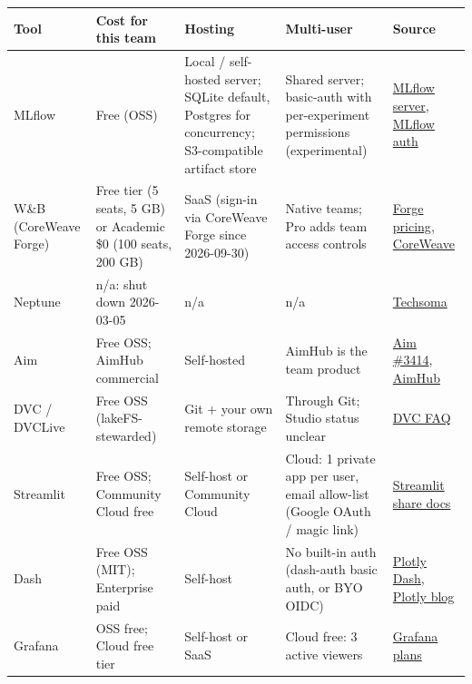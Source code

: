 \documentclass{article}
\begin{document}
\begin{center}\small
\begin{tabularx}{\linewidth}{>{\raggedright\arraybackslash}X >{\raggedright\arraybackslash}X >{\raggedright\arraybackslash}X >{\raggedright\arraybackslash}X >{\raggedright\arraybackslash}X}
\toprule
\textbf{Tool} & \textbf{Cost for this team} & \textbf{Hosting} & \textbf{Multi-user} & \textbf{Source} \\
\midrule
MLflow & Free (OSS) & Local /\allowbreak{} self-hosted server; SQLite default, Postgres for concurrency; S3-compatible artifact store & Shared server; basic-auth with per-experiment permissions (experimental) & \href{https://mlflow.org/docs/latest/self-hosting/architecture/tracking-server/}{MLflow server}, \href{https://mlflow.org/docs/latest/self-hosting/security/basic-http-auth/}{MLflow auth} \\
W\&B (CoreWeave Forge) & Free tier (5 seats, 5 GB) or Academic \$0 (100 seats, 200 GB) & SaaS (sign-in via CoreWeave Forge since 2026-09-30) & Native teams; Pro adds team access controls & \href{https://coreweave.com/forge-pricing}{Forge pricing}, \href{https://www.coreweave.com/companies/weights-and-biases}{CoreWeave} \\
Neptune & n/\allowbreak{}a: shut down 2026-03-05 & n/\allowbreak{}a & n/\allowbreak{}a & \href{https://techsoma.ca/openai-neptune-acquisition-shutdown/}{Techsoma} \\
Aim & Free OSS; AimHub commercial & Self-hosted & AimHub is the team product & \href{https://github.com/aimhubio/aim/issues/3414}{Aim \#3414}, \href{https://aimstack.io/blog/new-releases/introducing-aimhub-aim-now-available-for-teams}{AimHub} \\
DVC /\allowbreak{} DVCLive & Free OSS (lakeFS-stewarded) & Git + your own remote storage & Through Git; Studio status unclear & \href{https://dvc.org/blog/dvc-joins-lakefs-your-questions-answered/}{DVC FAQ} \\
Streamlit & Free OSS; Community Cloud free & Self-host or Community Cloud & Cloud: 1 private app per user, email allow-list (Google OAuth /\allowbreak{} magic link) & \href{https://docs.streamlit.io/deploy/streamlit-community-cloud/share-your-app}{Streamlit share docs} \\
Dash & Free OSS (MIT); Enterprise paid & Self-host & No built-in auth (dash-auth basic auth, or BYO OIDC) & \href{https://plotly.com/dash/}{Plotly Dash}, \href{https://plotly.com/blog/how-to-keep-your-data-safe-with-dash/}{Plotly blog} \\
Grafana & OSS free; Cloud free tier & Self-host or SaaS & Cloud free: 3 active viewers & \href{https://grafana.com/docs/grafana-cloud/platform/pricing-and-usage/stack-plans/}{Grafana plans} \\

\end{tabularx}
\end{center}
\end{document}
